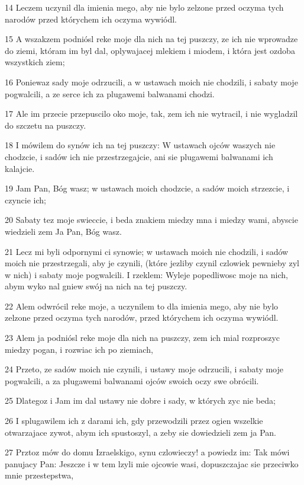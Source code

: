 \par 14 Leczem uczynil dla imienia mego, aby nie bylo zelzone przed oczyma tych narodów przed którychem ich oczyma wywiódl.
\par 15 A wszakzem podniósl reke moje dla nich na tej puszczy, ze ich nie wprowadze do ziemi, któram im byl dal, oplywajacej mlekiem i miodem, i która jest ozdoba wszystkich ziem;
\par 16 Poniewaz sady moje odrzucili, a w ustawach moich nie chodzili, i sabaty moje pogwalcili, a ze serce ich za plugawemi balwanami chodzi.
\par 17 Ale im przecie przepuscilo oko moje, tak, zem ich nie wytracil, i nie wygladzil do szczetu na puszczy.
\par 18 I mówilem do synów ich na tej puszczy: W ustawach ojców waszych nie chodzcie, i sadów ich nie przestrzegajcie, ani sie plugawemi balwanami ich kalajcie.
\par 19 Jam Pan, Bóg wasz; w ustawach moich chodzcie, a sadów moich strzezcie, i czyncie ich;
\par 20 Sabaty tez moje swieccie, i beda znakiem miedzy mna i miedzy wami, abyscie wiedzieli zem Ja Pan, Bóg wasz.
\par 21 Lecz mi byli odpornymi ci synowie; w ustawach moich nie chodzili, i sadów moich nie przestrzegali, aby je czynili, (które jezliby czynil czlowiek pewnieby zyl w nich) i sabaty moje pogwalcili. I rzeklem: Wyleje popedliwosc moje na nich, abym wyko nal gniew swój na nich na tej puszczy.
\par 22 Alem odwrócil reke moje, a uczynilem to dla imienia mego, aby nie bylo zelzone przed oczyma tych narodów, przed którychem ich oczyma wywiódl.
\par 23 Alem ja podniósl reke moje dla nich na puszczy, zem ich mial rozproszyc miedzy pogan, i rozwiac ich po ziemiach,
\par 24 Przeto, ze sadów moich nie czynili, i ustawy moje odrzucili, i sabaty moje pogwalcili, a za plugawemi balwanami ojców swoich oczy swe obrócili.
\par 25 Dlategoz i Jam im dal ustawy nie dobre i sady, w których zyc nie beda;
\par 26 I splugawilem ich z darami ich, gdy przewodzili przez ogien wszelkie otwarzajace zywot, abym ich spustoszyl, a zeby sie dowiedzieli zem ja Pan.
\par 27 Prztoz mów do domu Izraelskigo, synu czlowieczy! a powiedz im: Tak mówi panujacy Pan: Jeszcze i w tem lzyli mie ojcowie wasi, dopuszczajac sie przeciwko mnie przestepstwa,
